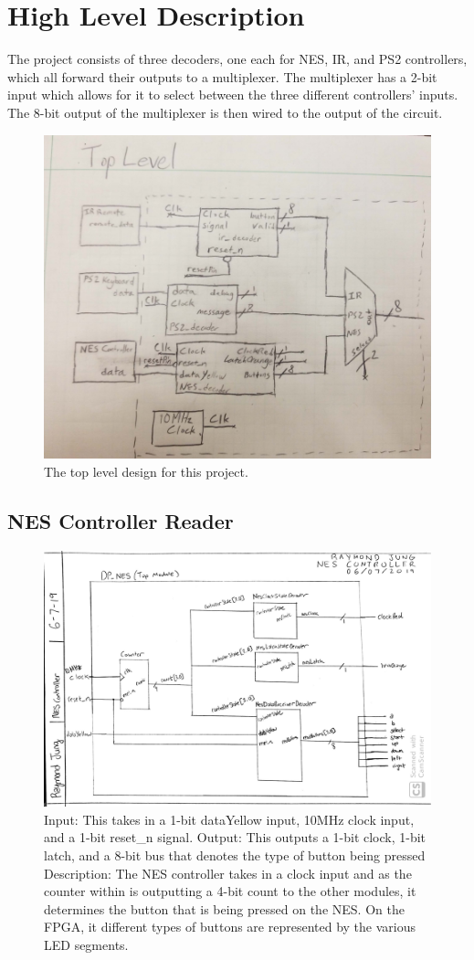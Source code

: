 \documentclass[a4paper]{article}
\begin{document}
\newpage
\section{High Level Description}

The project consists of three decoders, one each for NES, IR, and PS2 controllers, which all forward their outputs to a multiplexer. The multiplexer has a 2-bit input which allows for it to select between the three different controllers' inputs. The 8-bit output of the multiplexer is then wired to the output of the circuit. 

\begin{figure}[ht]
  \centering
    \includegraphics[width=.5\textwidth]{images/block_diagrams/top_level.png}
	\caption{The top level design for this project.}
    \label{fig:top_level}
\end{figure}


\subsection{NES Controller Reader}

\begin{figure}[H]
  \centering
    \includegraphics[width=.85\textwidth]{images/block_diagrams/nes/nestoplevel1.jpg}
	\caption{Input: This takes in a 1-bit dataYellow input, 10MHz clock input, and a 1-bit reset_n signal.
Output: This outputs a 1-bit clock, 1-bit latch, and a 8-bit bus that denotes the type of button being pressed
Description: The NES controller takes in a clock input and as the counter within is outputting a 4-bit count to the other modules, it determines the button that is being pressed on the NES. On the FPGA, it different types of buttons are represented by the various LED segments.}
    \label{fig:top_level_block}
\end{figure}
\end{document}
